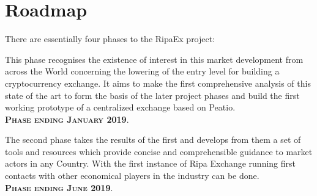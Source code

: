 \documentclass[11pt,fleqn,oneside]{book} %
\begin{document}
\pagebreak
\section{Roadmap}
There are essentially four phases to the RipaEx project:\\

\begin{center}
\begin{tcolorbox}[roadmapBox,
	title=\textsc{Funding the project: XPX presale and RIPA TEC (WP2)}]

	This phase recognises the existence of interest in this market development
	from across the World concerning the lowering of the entry level for building a cryptocurrency exchange.
	It aims to make the first comprehensive analysis of this state of the art to form the basis of the later project phases and
	build the first working prototype of a centralized exchange based on Peatio.\\
	\vspace{1cm}
	\centering\textbf{\textsc{Phase ending January 2019}}.
\end{tcolorbox}

\resizebox{0.05\textwidth}{26pt}{$\Downarrow$}

\begin{tcolorbox}[roadmapBox,
	title=\textsc{First exchange opening and development of tools and resources (WP3)}]

	The second phase takes the results of the first 
	and develops from them a set of tools and resources which provide concise and comprehensible guidance to market actors in any
	Country. With the first instance of Ripa Exchange running first contacts with other economical players in the industry can be
	done.\\
	\vspace{1cm}
	\centering\textbf{\textsc{Phase ending June 2019}}.
\end{tcolorbox}

\resizebox{0.05\textwidth}{26pt}{$\Downarrow$}

\begin{tcolorbox}[roadmapBox,
	title=\textsc{Dissemination (WP 7/8) and Project Coordination (WP1)}]


\end{tcolorbox}
\end{center}
\end{document}
